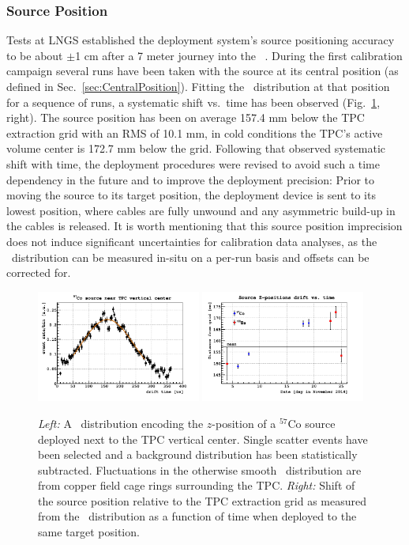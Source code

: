 \subsubsection{Source Position}\label{sec:SourcePosition}
Tests at LNGS established the deployment system's source positioning accuracy to be about $\pm$1 cm after a 7 meter journey into the \dsf\ \lsv.
During the first calibration campaign several runs have been taken with the source at its central position (as defined in Sec.~\ref{sec:CentralPosition}). %
Fitting the \tdrift\ distribution at that position for a sequence of runs, a systematic shift vs.~time has been observed (Fig.~\ref{fig:SourcePosition}, right). The source position has been on average 157.4 mm below the TPC extraction grid with an RMS of 10.1 mm, in cold conditions the TPC's active volume center is 172.7 mm below the grid. Following that observed systematic shift with time, the deployment procedures were revised to avoid such a time dependency in the future and to improve the deployment precision: Prior to moving the source to its target position, the deployment device is sent to its lowest position, where cables are fully unwound and any asymmetric build-up in the cables is released. It is worth mentioning that this source position imprecision does not induce significant uncertainties for calibration data analyses, as the \tdrift\ distribution can be measured in-situ on a per-run basis and offsets can be corrected for.
\begin{figure}[htbp]
\centering
\includegraphics[width=0.48\textwidth]{./Figures/Tdrift_distribution_Co57.png}
\includegraphics[width=0.48\textwidth]{./Figures/SourcePosition_vs_time.png}
\caption{\textit{Left:} A \tdrift\ distribution encoding the $z$-position of a $^{57}$Co source deployed next to the TPC vertical center. Single scatter events have been selected and a background distribution has been statistically subtracted. Fluctuations in the otherwise smooth \tdrift\ distribution are from copper field cage rings surrounding the TPC.
\textit{Right:} Shift of the source position relative to the TPC extraction grid as measured from the \tdrift\ distribution as a function of time when deployed to the same target position.
\label{fig:SourcePosition}} 
\end{figure}

